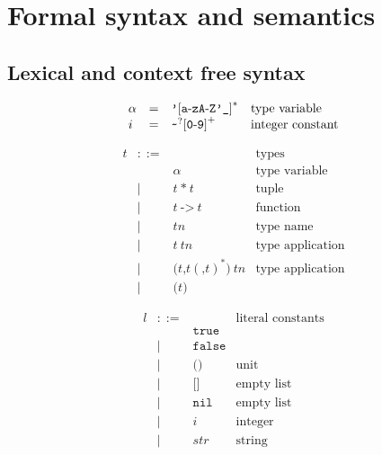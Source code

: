 \documentclass[12pt,a4paper]{book}
\newcommand{\gramsep}{|}
\begin{document}
\chapter{Formal syntax and semantics}

\section{Lexical and context free syntax}

\[
\begin{array}{lcll}
\alpha&=& \mbox{\texttt{'}[\texttt{a}-\texttt{z}\texttt{A}-\texttt{Z}\texttt{'}\texttt{\_}]}^*&\mbox{type variable}\\
i &=& \verb|~|^?\mbox{[\texttt{0}-\texttt{9}]}^+&\mbox{integer constant}\\
\end{array}
\]



\[
\begin{array}{lcll}
t & ::= & &\mbox{types}\\
&&\alpha & \mbox{type variable}\\
& \gramsep& t\ \texttt{*}\ t & \mbox{tuple}\\
 &\gramsep &t\ \texttt{->}\ t&\mbox{function}\\
 &\gramsep& \mathit{tn}&\mbox{type name}\\
 &\gramsep&t\ \mathit{tn}&\mbox{type application}\\
 &\gramsep& \texttt{(}t\texttt{,}t(\texttt{,}t)^*\texttt{)}\ \mathit{tn}&\mbox{type application}\\
 &\gramsep&\texttt{(}t\texttt{)}
 \end{array}
 \]

 \[
\begin{array}{lcll}
l & ::= &&\mbox{literal constants}\\
&& \texttt{true}\\
&\gramsep& \texttt{false}\\
&\gramsep& \texttt{(}\texttt{)}&\mbox{unit}\\
&\gramsep& \texttt{[}\texttt{]}&\mbox{empty list}\\
&\gramsep& \texttt{nil}&\mbox{empty list}\\
&\gramsep& i &\mbox{integer}\\
&\gramsep& \textit{str} &\mbox{string}\\
 \end{array}
\]
\end{document}
